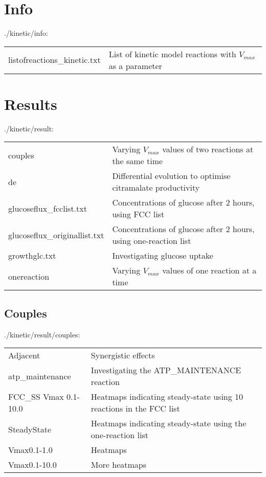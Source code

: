 \documentclass[a4paper, parskip=full]{scrreprt}
\begin{document}
\section{Info}
\label{sec:kininfo}

./kinetic/info:

\begin{longtable}{ll}
listofreactions\_kinetic.txt & List of kinetic model reactions with $V_{max}$ as a parameter
\end{longtable}

\section{Results}
\label{sec:kinresult}

./kinetic/result:

\begin{longtable}{ll}
couples & Varying $V_{max}$ values of two reactions at the same time\\
de & Differential evolution to optimise citramalate productivity\\
glucoseflux\_fcclist.txt & Concentrations of glucose after 2 hours, using FCC list\\
glucoseflux\_originallist.txt & Concentrations of glucose after 2 hours, using one-reaction list\\
growthglc.txt & Investigating glucose uptake\\
onereaction & Varying $V_{max}$ values of one reaction at a time
\end{longtable}

\subsection{Couples}
\label{ssec:couples}

./kinetic/result/couples:

\begin{longtable}{ll}
Adjacent & Synergistic effects\\
atp\_maintenance & Investigating the ATP\_MAINTENANCE reaction\\
FCC\_SS Vmax 0.1-10.0 & Heatmaps indicating steady-state using 10 reactions in the FCC list\\
SteadyState & Heatmaps indicating steady-state using the one-reaction list\\
Vmax0.1-1.0 & Heatmaps\\
Vmax0.1-10.0 & More heatmaps
\end{longtable}
\end{document}
